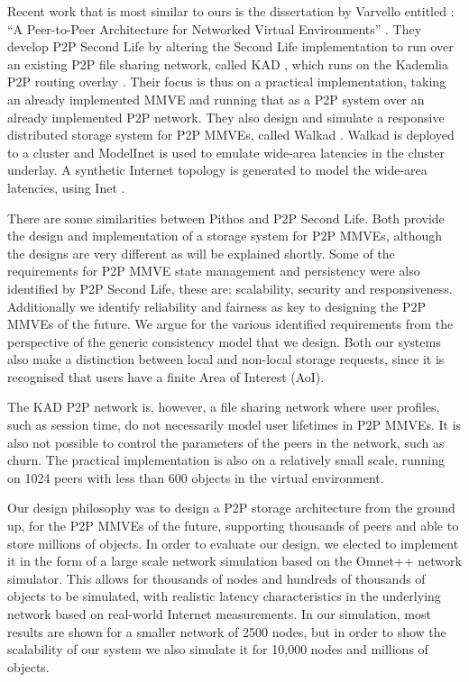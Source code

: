 Recent work that is most similar to ours is the dissertation by Varvello entitled : ``A Peer-to-Peer Architecture for Networked Virtual Environments'' \cite{varvello_phd}. They develop P2P Second Life by altering the Second Life implementation to run over an existing P2P file sharing network, called KAD \cite{KAD_Steiner}, which runs on the Kademlia P2P routing overlay \cite{Kademlia_Maymounkov}. Their focus is thus on a practical implementation, taking an already implemented MMVE and running that as a P2P system over an already implemented P2P network. They also design and simulate a responsive distributed storage system for P2P MMVEs, called Walkad \cite{Walkad_Varvello}. Walkad is deployed to a cluster and ModelInet \cite{ModelInet_Vahdat} is used to emulate wide-area latencies in the cluster underlay. A synthetic Internet topology is generated to model the wide-area latencies, using Inet \cite{Inet_warwick_jamin}.

There are some similarities between Pithos and P2P Second Life. Both provide the design and implementation of a storage system for P2P MMVEs, although the designs are very different as will be explained shortly. Some of the requirements for P2P MMVE state management and persistency were also identified by P2P Second Life, these are: scalability, security and responsiveness. Additionally we identify reliability and fairness as key to designing the P2P MMVEs of the future. We argue for the various identified requirements from the perspective of the generic consistency model that we design. Both our systems also make a distinction between local and non-local storage requests, since it is recognised that users have a finite Area of Interest (AoI).

The KAD P2P network is, however, a file sharing network where user profiles, such as session time, do not necessarily model user lifetimes in P2P MMVEs. It is also not possible to control the parameters of the peers in the network, such as churn. The practical implementation is also on a relatively small scale, running on 1024 peers with less than 600 objects in the virtual environment.

Our design philosophy was to design a P2P storage architecture from the ground up, for the P2P MMVEs of the future, supporting thousands of peers and able to store millions of objects. In order to evaluate our design, we elected to implement it in the form of a large scale network simulation based on the Omnet++ network simulator. This allows for thousands of nodes and hundreds of thousands of objects to be simulated, with realistic latency characteristics in the underlying network based on real-world Internet measurements. In our simulation, most results are shown for a smaller network of 2500 nodes, but in order to show the scalability of our system we also simulate it for 10,000 nodes and millions of objects.

